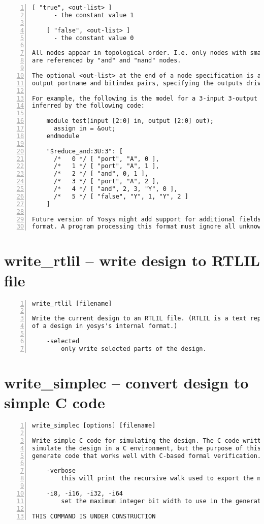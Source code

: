 \begin{lstlisting}[numbers=left,frame=single]
    [ "true", <out-list> ]
      - the constant value 1

    [ "false", <out-list> ]
      - the constant value 0

All nodes appear in topological order. I.e. only nodes with smaller indices
are referenced by "and" and "nand" nodes.

The optional <out-list> at the end of a node specification is a list of
output portname and bitindex pairs, specifying the outputs driven by this node.

For example, the following is the model for a 3-input 3-output $reduce_and cell
inferred by the following code:

    module test(input [2:0] in, output [2:0] out);
      assign in = &out;
    endmodule

    "$reduce_and:3U:3": [
      /*   0 */ [ "port", "A", 0 ],
      /*   1 */ [ "port", "A", 1 ],
      /*   2 */ [ "and", 0, 1 ],
      /*   3 */ [ "port", "A", 2 ],
      /*   4 */ [ "and", 2, 3, "Y", 0 ],
      /*   5 */ [ "false", "Y", 1, "Y", 2 ]
    ]

Future version of Yosys might add support for additional fields in the JSON
format. A program processing this format must ignore all unknown fields.
\end{lstlisting}

\section{write\_rtlil -- write design to RTLIL file}
\label{cmd:write_rtlil}
\begin{lstlisting}[numbers=left,frame=single]
    write_rtlil [filename]

Write the current design to an RTLIL file. (RTLIL is a text representation
of a design in yosys's internal format.)

    -selected
        only write selected parts of the design.
\end{lstlisting}

\section{write\_simplec -- convert design to simple C code}
\label{cmd:write_simplec}
\begin{lstlisting}[numbers=left,frame=single]
    write_simplec [options] [filename]

Write simple C code for simulating the design. The C code written can be used to
simulate the design in a C environment, but the purpose of this command is to
generate code that works well with C-based formal verification.

    -verbose
        this will print the recursive walk used to export the modules.

    -i8, -i16, -i32, -i64
        set the maximum integer bit width to use in the generated code.

THIS COMMAND IS UNDER CONSTRUCTION
\end{lstlisting}

